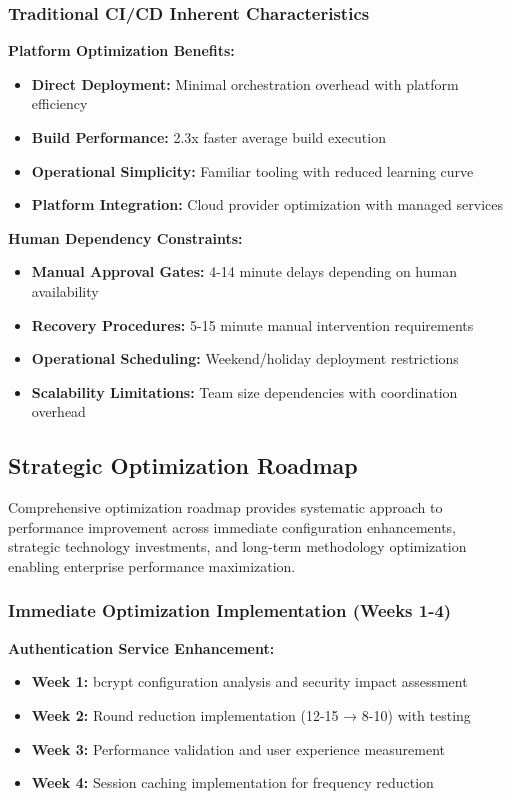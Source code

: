 \subsubsection{Traditional CI/CD Inherent Characteristics}

\textbf{Platform Optimization Benefits:}
\begin{itemize}
\item \textbf{Direct Deployment:} Minimal orchestration overhead with platform efficiency
\item \textbf{Build Performance:} 2.3x faster average build execution
\item \textbf{Operational Simplicity:} Familiar tooling with reduced learning curve
\item \textbf{Platform Integration:} Cloud provider optimization with managed services
\end{itemize}

\textbf{Human Dependency Constraints:}
\begin{itemize}
\item \textbf{Manual Approval Gates:} 4-14 minute delays depending on human availability
\item \textbf{Recovery Procedures:} 5-15 minute manual intervention requirements
\item \textbf{Operational Scheduling:} Weekend/holiday deployment restrictions
\item \textbf{Scalability Limitations:} Team size dependencies with coordination overhead
\end{itemize}

\subsection{Strategic Optimization Roadmap}
\label{subsec:optimization_roadmap}

Comprehensive optimization roadmap provides systematic approach to performance improvement across immediate configuration enhancements, strategic technology investments, and long-term methodology optimization enabling enterprise performance maximization.

\subsubsection{Immediate Optimization Implementation (Weeks 1-4)}

\textbf{Authentication Service Enhancement:}
\begin{itemize}
\item \textbf{Week 1:} bcrypt configuration analysis and security impact assessment
\item \textbf{Week 2:} Round reduction implementation (12-15 → 8-10) with testing
\item \textbf{Week 3:} Performance validation and user experience measurement
\item \textbf{Week 4:} Session caching implementation for frequency reduction
\end{itemize}

